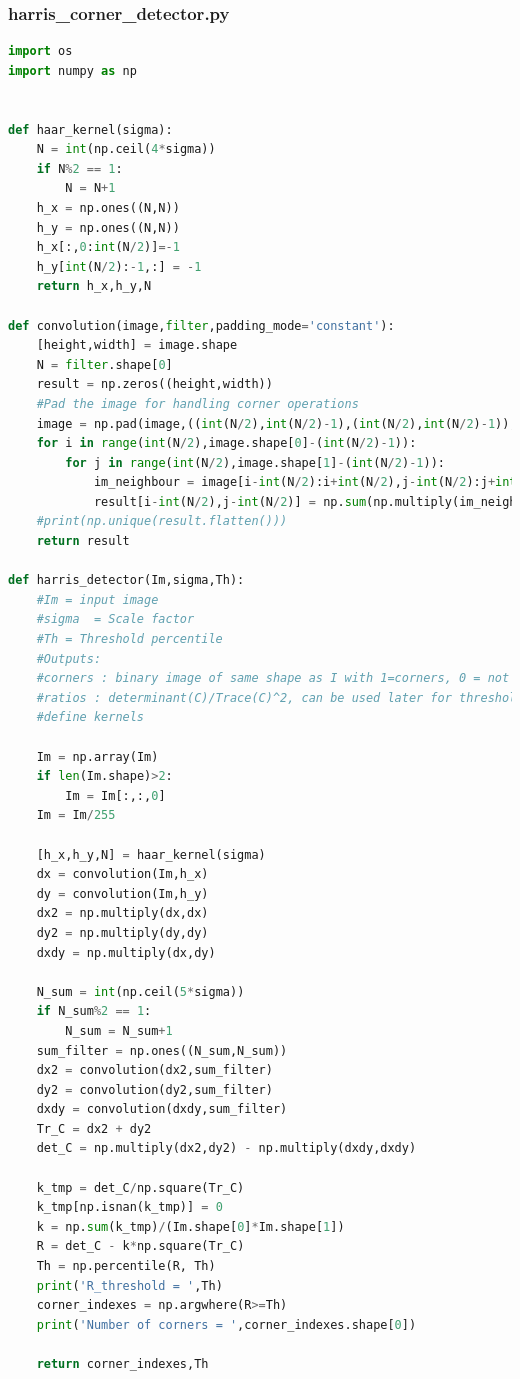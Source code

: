 \documentclass{article}
\begin{document}
\subsubsection{harris\_corner\_detector.py}
\begin{lstlisting}[language=Python]
import os
import numpy as np


def haar_kernel(sigma):
	N = int(np.ceil(4*sigma))
	if N%2 == 1:
		N = N+1
	h_x = np.ones((N,N))
	h_y = np.ones((N,N))
	h_x[:,0:int(N/2)]=-1
	h_y[int(N/2):-1,:] = -1
	return h_x,h_y,N

def convolution(image,filter,padding_mode='constant'):
	[height,width] = image.shape
	N = filter.shape[0]
	result = np.zeros((height,width))
	#Pad the image for handling corner operations
	image = np.pad(image,((int(N/2),int(N/2)-1),(int(N/2),int(N/2)-1)),mode=padding_mode)
	for i in range(int(N/2),image.shape[0]-(int(N/2)-1)):
		for j in range(int(N/2),image.shape[1]-(int(N/2)-1)):
			im_neighbour = image[i-int(N/2):i+int(N/2),j-int(N/2):j+int(N/2)]
			result[i-int(N/2),j-int(N/2)] = np.sum(np.multiply(im_neighbour,filter))
	#print(np.unique(result.flatten()))
	return result

def harris_detector(Im,sigma,Th):
	#Im = input image
	#sigma  = Scale factor
	#Th = Threshold percentile
	#Outputs:
	#corners : binary image of same shape as I with 1=corners, 0 = not corners
	#ratios : determinant(C)/Trace(C)^2, can be used later for thresholding with a separate threshold
	#define kernels

	Im = np.array(Im)
	if len(Im.shape)>2:
		Im = Im[:,:,0]
	Im = Im/255

	[h_x,h_y,N] = haar_kernel(sigma)
	dx = convolution(Im,h_x)
	dy = convolution(Im,h_y)
	dx2 = np.multiply(dx,dx)
	dy2 = np.multiply(dy,dy)
	dxdy = np.multiply(dx,dy)

	N_sum = int(np.ceil(5*sigma))
	if N_sum%2 == 1:
		N_sum = N_sum+1
	sum_filter = np.ones((N_sum,N_sum))
	dx2 = convolution(dx2,sum_filter)
	dy2 = convolution(dy2,sum_filter)
	dxdy = convolution(dxdy,sum_filter)
	Tr_C = dx2 + dy2
	det_C = np.multiply(dx2,dy2) - np.multiply(dxdy,dxdy)

	k_tmp = det_C/np.square(Tr_C)
	k_tmp[np.isnan(k_tmp)] = 0
	k = np.sum(k_tmp)/(Im.shape[0]*Im.shape[1])
	R = det_C - k*np.square(Tr_C)
	Th = np.percentile(R, Th)
	print('R_threshold = ',Th)
	corner_indexes = np.argwhere(R>=Th)
	print('Number of corners = ',corner_indexes.shape[0])

	return corner_indexes,Th
\end{lstlisting}
\end{document}
